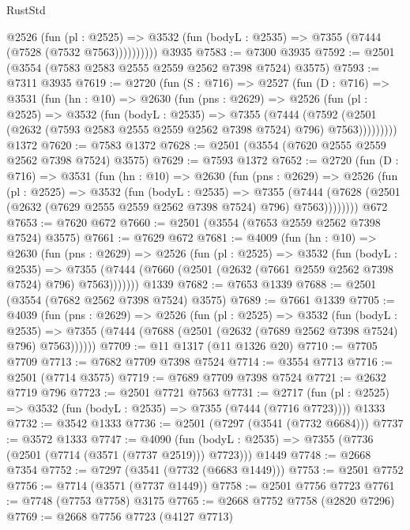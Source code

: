 \begin{lexlean}{RustStd}
\begin{coremodule}
{\begin{coremodule}
{{{{{{{{{{{{{{{{{{{{            @2526
              (fun (pl : @2525) =>
              @3532 (fun (bodyL : @2535) => @7355 (@7444 (@7528 (@7532 @7563))))))))))
    @3935
@7583 := @7300 @3935
@7592 := @2501 (@3554 (@7583 @2583 @2555 @2559 @2562 @7398 @7524) @3575)
@7593 := @7311 @3935
@7619 := @2720
    (fun (S : @716) =>
    @2527
      (fun (D : @716) =>
      @3531
        (fun (hn : @10) =>
        @2630
          (fun (pns : @2629) =>
          @2526
            (fun (pl : @2525) =>
            @3532
              (fun (bodyL : @2535) =>
              @7355
                (@7444
                  (@7592
                    (@2501 (@2632 (@7593 @2583 @2555 @2559 @2562 @7398 @7524) @796) @7563)))))))))
    @1372
@7620 := @7583 @1372
@7628 := @2501 (@3554 (@7620 @2555 @2559 @2562 @7398 @7524) @3575)
@7629 := @7593 @1372
@7652 := @2720
    (fun (D : @716) =>
    @3531
      (fun (hn : @10) =>
      @2630
        (fun (pns : @2629) =>
        @2526
          (fun (pl : @2525) =>
          @3532
            (fun (bodyL : @2535) =>
            @7355
              (@7444 (@7628 (@2501 (@2632 (@7629 @2555 @2559 @2562 @7398 @7524) @796) @7563))))))))
    @672
@7653 := @7620 @672
@7660 := @2501 (@3554 (@7653 @2559 @2562 @7398 @7524) @3575)
@7661 := @7629 @672
@7681 := @4009
    (fun (hn : @10) =>
    @2630
      (fun (pns : @2629) =>
      @2526
        (fun (pl : @2525) =>
        @3532
          (fun (bodyL : @2535) =>
          @7355 (@7444 (@7660 (@2501 (@2632 (@7661 @2559 @2562 @7398 @7524) @796) @7563)))))))
    @1339
@7682 := @7653 @1339
@7688 := @2501 (@3554 (@7682 @2562 @7398 @7524) @3575)
@7689 := @7661 @1339
@7705 := @4039
    (fun (pns : @2629) =>
    @2526
      (fun (pl : @2525) =>
      @3532
        (fun (bodyL : @2535) =>
        @7355 (@7444 (@7688 (@2501 (@2632 (@7689 @2562 @7398 @7524) @796) @7563))))))
@7709 := @11 @1317 (@11 @1326 @20)
@7710 := @7705 @7709
@7713 := @7682 @7709 @7398 @7524
@7714 := @3554 @7713
@7716 := @2501 (@7714 @3575)
@7719 := @7689 @7709 @7398 @7524
@7721 := @2632 @7719 @796
@7723 := @2501 @7721 @7563
@7731 := @2717
    (fun (pl : @2525) => @3532 (fun (bodyL : @2535) => @7355 (@7444 (@7716 @7723))))
    @1333
@7732 := @3542 @1333
@7736 := @2501 (@7297 (@3541 (@7732 @6684)))
@7737 := @3572 @1333
@7747 := @4090
    (fun (bodyL : @2535) => @7355 (@7736 (@2501 (@7714 (@3571 (@7737 @2519))) @7723)))
    @1449
@7748 := @2668 @7354
@7752 := @7297 (@3541 (@7732 (@6683 @1449)))
@7753 := @2501 @7752
@7756 := @7714 (@3571 (@7737 @1449))
@7758 := @2501 @7756 @7723
@7761 := @7748 (@7753 @7758) @3175
@7765 := @2668 @7752 @7758 (@2820 @7296)
@7769 := @2668 @7756 @7723 (@4127 @7713)
}}}}}}}}}}}}}}}}}}}}
\end{coremodule}}
\end{coremodule}
\end{lexlean}
